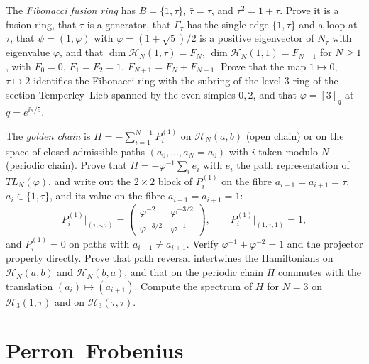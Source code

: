 \begin{exercise}
The \emph{Fibonacci fusion ring} has $B=\{1,\tau\}$, $\bar\tau=\tau$, and $\tau^2=1+\tau$. Prove it is a fusion ring, that $\tau$ is a generator, that $\Gamma_\tau$ has the single edge $\{1,\tau\}$ and a loop at $\tau$, that $\psi=(1,\varphi)$ with $\varphi=(1+\sqrt5)/2$ is a positive eigenvector of $N_\tau$ with eigenvalue $\varphi$, and that $\dim\mathcal H_N(1,\tau)=F_N$, $\dim\mathcal H_N(1,1)=F_{N-1}$ for $N\ge1$, with $F_0=0$, $F_1=F_2=1$, $F_{N+1}=F_N+F_{N-1}$. Prove that the map $1\mapsto0$, $\tau\mapsto2$ identifies the Fibonacci ring with the subring of the level-$3$ ring of the section Temperley--Lieb spanned by the even simples $0,2$, and that $\varphi=[3]_q$ at $q=e^{\ii\pi/5}$.

The \emph{golden chain} is $H=-\sum_{i=1}^{N-1}P^{(1)}_i$ on $\mathcal H_N(a,b)$ (open chain) or on the space of closed admissible paths $(a_0,\dots,a_N=a_0)$ with $i$ taken modulo $N$ (periodic chain). Prove that $H=-\varphi^{-1}\sum_ie_i$ with $e_i$ the path representation of $TL_N(\varphi)$, and write out the $2\times2$ block of $P^{(1)}_i$ on the fibre $a_{i-1}=a_{i+1}=\tau$, $a_i\in\{1,\tau\}$, and its value on the fibre $a_{i-1}=a_{i+1}=1$:
\[
P^{(1)}_i\big|_{(\tau,\cdot,\tau)}=\begin{pmatrix}\varphi^{-2}&\varphi^{-3/2}\\ \varphi^{-3/2}&\varphi^{-1}\end{pmatrix},\qquad P^{(1)}_i\big|_{(1,\tau,1)}=1,
\]
and $P^{(1)}_i=0$ on paths with $a_{i-1}\ne a_{i+1}$. Verify $\varphi^{-1}+\varphi^{-2}=1$ and the projector property directly. Prove that path reversal intertwines the Hamiltonians on $\mathcal H_N(a,b)$ and $\mathcal H_N(b,a)$, and that on the periodic chain $H$ commutes with the translation $(a_i)\mapsto(a_{i+1})$. Compute the spectrum of $H$ for $N=3$ on $\mathcal H_3(1,\tau)$ and on $\mathcal H_3(\tau,\tau)$.
\end{exercise}

\section{Perron--Frobenius}

